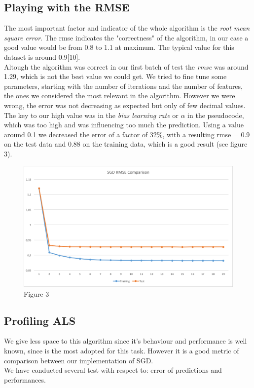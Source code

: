 \documentclass{sig-alternate-05-2015}
\begin{document}
\subsection{Playing with the RMSE}
The most important factor and indicator of the whole algorithm is the \textit{root mean
square error}. The rmse indicates the "correctness" of the algorithm, in our case
a good value would be from 0.8 to 1.1 at maximum. The typical value for this dataset
is around 0.9[10].\\
Altough the algorithm was correct in our first batch of test the \textit{rmse} was
around 1.29, which is not the best value we could get. We tried to fine tune some
parameters, starting with the number of iterations and the number of features, the ones
we considered the most relevant in the algorithm. However we were wrong, the
error was not decreasing as expected but only of few decimal values.
The key to our high value was in the \textit{bias learning rate} or $\alpha$ in the pseudocode,
which was too high and was influencing too much the prediction. Using a value around 0.1 we decreased
the error of a factor of 32$\%$, with a resulting rmse = 0.9 on the test data and 0.88 on the training data,
which is a good result (see figure 3).
\begin{figure}
    \caption{Figure 3}
    \centering
    \includegraphics[scale=0.4]{sgdrmseserial.png}
\end{figure}

\subsection{Profiling ALS}

We give less space to this algorithm since it's behaviour and performance
is well known, since is the most adopted for this task. However it is
a good metric of comparison between our implementation of SGD.\\
We have conducted several test with respect to: error of predictions and performances.
\end{document}
